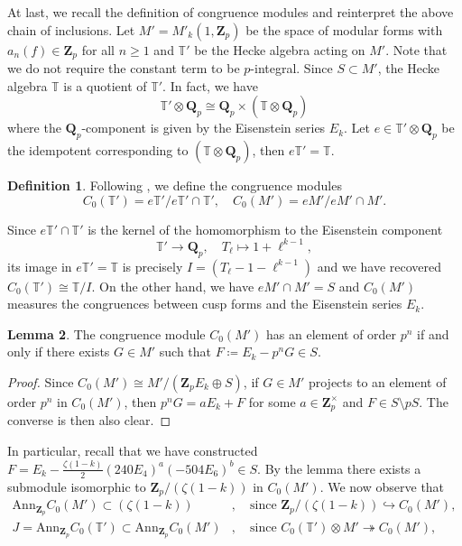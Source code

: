 \documentclass[11pt]{amsart}
\newcommand{\Q}{\mathbf{Q}}  %
\newcommand{\Z}{\mathbf{Z}}  %
\theoremstyle{definition}
\newtheorem{definition}{Definition}[section]
\theoremstyle{definition}
\theoremstyle{definition}
\theoremstyle{definition}
\theoremstyle{definition}
\theoremstyle{definition}
\newtheorem{lemma}[definition]{Lemma}
\begin{document}
At last, we recall the definition of congruence modules and 
reinterpret the above chain of inclusions.
Let $M'=M'_k(1,\Z_p)$ be the space of modular forms
with $a_n(f)\in \Z_p$ for all $n\geq 1$ and 
$\mathbb{T}'$ be the Hecke algebra acting on $M'$.
Note that we do not require the constant term to be $p$-integral.
Since $S\subset M'$, the Hecke algebra $\mathbb{T}$ is a quotient of $\mathbb{T}'$.
In fact, we have
\begin{equation*}
    \mathbb{T}'\otimes \Q_p\cong \Q_p\times (\mathbb{T}\otimes \Q_p)
\end{equation*}
where the $\Q_p$-component is given by the Eisenstein series $E_k$.
Let $e\in \mathbb{T}'\otimes \Q_p$ be the idempotent corresponding to $(\mathbb{T}\otimes \Q_p)$, then $e\mathbb{T}'=\mathbb{T}$.
\begin{definition}
    Following \cite{Ti},
    we define the congruence modules
    \begin{equation*}
    C_0(\mathbb{T}')=e\mathbb{T}'/e\mathbb{T}'\cap \mathbb{T}',\quad
    C_0(M')=eM'/eM'\cap M'.
    \end{equation*}
\end{definition}
Since $e\mathbb{T}'\cap \mathbb{T}'$ is the kernel of the homomorphism to the Eisenstein component
\begin{equation*}
    \mathbb{T}'\to \Q_p,\quad T_\ell\mapsto 1+\ell^{k-1},
\end{equation*}
its image in $e\mathbb{T}'=\mathbb{T}$ is 
precisely $I=(T_\ell-1-\ell^{k-1})$ and we have recovered $C_0(\mathbb{T}')\cong \mathbb{T}/I$.
On the other hand, we have $eM'\cap M'=S$ and $C_0(M')$ measures the congruences between cusp forms and the Eisenstein series $E_k$.
\begin{lemma}
    The congruence module $C_0(M')$ has an element of order $p^n$
    if and only if
    there exists $G\in M'$ such that
    $F\coloneqq E_k-p^nG\in S$.
\end{lemma}
\begin{proof}
    Since $C_0(M')\cong M'/(\Z_pE_k\oplus S)$,
    if $G\in M'$ projects to an element of order $p^n$ in $C_0(M')$,
    then $p^nG=aE_k+F$ for some $a\in \Z_p^\times$ and $F\in S\setminus pS$.
    The converse is then also clear.
\end{proof}
In particular, recall that we have constructed
$F=E_k-\frac{\zeta(1-k)}{2}(240E_4)^a(-504E_6)^b\in S$.
By the lemma there exists a submodule
isomorphic to $\Z_p/(\zeta(1-k))$ in $C_0(M')$. We now observe that
\begin{align*}
    \text{Ann}_{\Z_p}C_0(M')\subset(\zeta(1-k))&,\quad \text{since }\Z_p/(\zeta(1-k))\hookrightarrow C_0(M'),\\
    J=\text{Ann}_{\Z_p}C_0(\mathbb{T}')\subset\text{Ann}_{\Z_p}C_0(M')&,\quad
    \text{since }C_0(\mathbb{T}')\otimes M'\twoheadrightarrow C_0(M'),
\end{align*}
\end{document}
